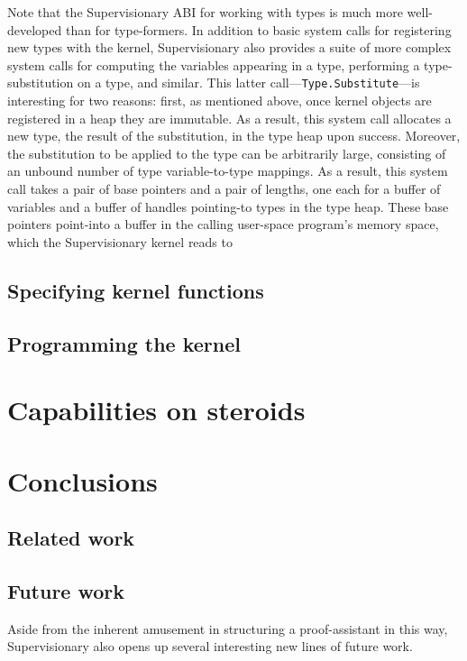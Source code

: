 \documentclass[a4paper, UKenglish, cleveref, autoref, thm-restate]{lipics-v2021}
\begin{document}
Note that the Supervisionary ABI for working with types is much more well-developed than for type-formers.
In addition to basic system calls for registering new types with the kernel, Supervisionary also provides a suite of more complex system calls for computing the variables appearing in a type, performing a type-substitution on a type, and similar.
This latter call---\texttt{Type.Substitute}---is interesting for two reasons: first, as mentioned above, once kernel objects are registered in a heap they are immutable.
As a result, this system call allocates a new type, the result of the substitution, in the type heap upon success.
Moreover, the substitution to be applied to the type can be arbitrarily large, consisting of an unbound number of type variable-to-type mappings.
As a result, this system call takes a pair of base pointers and a pair of lengths, one each for a buffer of variables and a buffer of handles pointing-to types in the type heap.
These base pointers point-into a buffer in the calling user-space program's memory space, which the Supervisionary kernel reads to 

\subsection{Specifying kernel functions}

\subsection{Programming the kernel}

\section{Capabilities on steroids}
\label{sect.capabilities.on.steroids}

\section{Conclusions}
\label{sect.conclusions}

\subsection{Related work}

\subsection{Future work}

Aside from the inherent amusement in structuring a proof-assistant in this way, Supervisionary also opens up several interesting new lines of future work.
\end{document}
